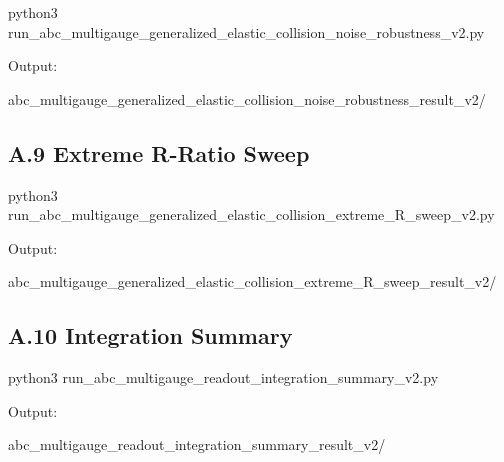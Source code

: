 \documentclass[
  a4paper,
]{article}
\newenvironment{Shaded}{}{}
\newcommand{\NormalTok}[1]{#1}
\begin{document}
\begin{Shaded}
\begin{Highlighting}[]
\NormalTok{python3 run\_abc\_multigauge\_generalized\_elastic\_collision\_noise\_robustness\_v2.py}
\end{Highlighting}
\end{Shaded}

Output:

\begin{Shaded}
\begin{Highlighting}[]
\NormalTok{abc\_multigauge\_generalized\_elastic\_collision\_noise\_robustness\_result\_v2/}
\end{Highlighting}
\end{Shaded}

\subsection{A.9 Extreme R-Ratio Sweep}\label{a.9-extreme-r-ratio-sweep}

\begin{Shaded}
\begin{Highlighting}[]
\NormalTok{python3 run\_abc\_multigauge\_generalized\_elastic\_collision\_extreme\_R\_sweep\_v2.py}
\end{Highlighting}
\end{Shaded}

Output:

\begin{Shaded}
\begin{Highlighting}[]
\NormalTok{abc\_multigauge\_generalized\_elastic\_collision\_extreme\_R\_sweep\_result\_v2/}
\end{Highlighting}
\end{Shaded}

\subsection{A.10 Integration Summary}\label{a.10-integration-summary}

\begin{Shaded}
\begin{Highlighting}[]
\NormalTok{python3 run\_abc\_multigauge\_readout\_integration\_summary\_v2.py}
\end{Highlighting}
\end{Shaded}

Output:

\begin{Shaded}
\begin{Highlighting}[]
\NormalTok{abc\_multigauge\_readout\_integration\_summary\_result\_v2/}
\end{Highlighting}
\end{Shaded}
\end{document}

